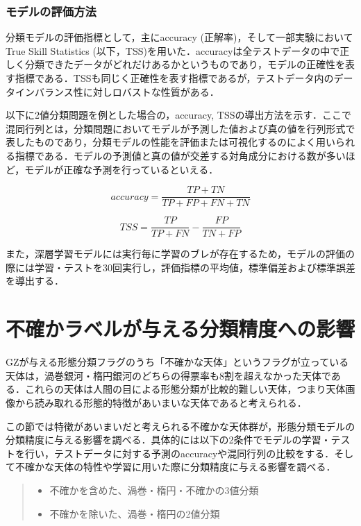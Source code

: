 \documentclass[a4j, 11pt]{jreport}
\begin{document}
\subsubsection{モデルの評価方法}
分類モデルの評価指標として，主にaccuracy (正解率)，そして一部実験においてTrue Skill Statistics (以下，TSS)を用いた．accuracyは全テストデータの中で正しく分類できたデータがどれだけあるかというものであり，モデルの正確性を表す指標である．TSSも同じく正確性を表す指標であるが，テストデータ内のデータインバランス性に対しロバストな性質がある．

以下に2値分類問題を例とした場合の，accuracy, TSSの導出方法を示す．ここで混同行列とは，分類問題においてモデルが予測した値および真の値を行列形式で表したものであり，分類モデルの性能を評価または可視化するのによく用いられる指標である．モデルの予測値と真の値が交差する対角成分における数が多いほど，モデルが正確な予測を行っているといえる．

\begin{equation}
 accuracy = \frac{TP + TN}{TP + FP + FN + TN}
 \label{equ:accuracy}
\end{equation}

\begin{equation}
	TSS = \frac{TP}{TP + FN} - \frac{FP}{TN + FP}
 \label{equ:tss}
\end{equation}

また，深層学習モデルには実行毎に学習のブレが存在するため，モデルの評価の際には学習・テストを30回実行し，評価指標の平均値，標準偏差および標準誤差を導出する．

\section{不確かラベルが与える分類精度への影響}
GZが与える形態分類フラグのうち「不確かな天体」というフラグが立っている天体は，渦巻銀河・楕円銀河のどちらの得票率も8割を超えなかった天体である．これらの天体は人間の目による形態分類が比較的難しい天体，つまり天体画像から読み取れる形態的特徴があいまいな天体であると考えられる．

この節では特徴があいまいだと考えられる不確かな天体群が，形態分類モデルの分類精度に与える影響を調べる．具体的には以下の2条件でモデルの学習・テストを行い，テストデータに対する予測のaccuracyや混同行列の比較をする．そして不確かな天体の特性や学習に用いた際に分類精度に与える影響を調べる．
\begin{quote}
 \begin{itemize}
	\item 不確かを含めた、渦巻・楕円・不確かの3値分類
	\item 不確かを除いた、渦巻・楕円の2値分類
 \end{itemize}
\end{quote}
\end{document}
